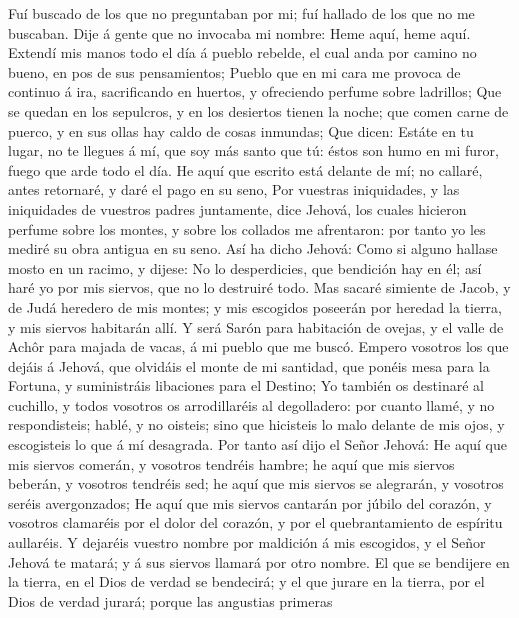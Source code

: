  Fuí buscado de los que no preguntaban por mi; fuí hallado
de los que no me buscaban. Dije á gente que no invocaba mi nombre: Heme
aquí, heme aquí.  Extendí mis manos todo el día á pueblo
rebelde, el cual anda por camino no bueno, en pos de sus pensamientos;
 Pueblo que en mi cara me provoca de continuo á ira,
sacrificando en huertos, y ofreciendo perfume sobre ladrillos;
 Que se quedan en los sepulcros, y en los desiertos tienen
la noche; que comen carne de puerco, y en sus ollas hay caldo de cosas
inmundas;  Que dicen: Estáte en tu lugar, no te llegues á
mí, que soy más santo que tú: éstos son humo en mi furor, fuego que arde
todo el día.  He aquí que escrito está delante de mí; no
callaré, antes retornaré, y daré el pago en su seno,  Por
vuestras iniquidades, y las iniquidades de vuestros padres juntamente,
dice Jehová, los cuales hicieron perfume sobre los montes, y sobre los
collados me afrentaron: por tanto yo les mediré su obra antigua en su
seno.  Así ha dicho Jehová: Como si alguno hallase mosto en
un racimo, y dijese: No lo desperdicies, que bendición hay en él; así
haré yo por mis siervos, que no lo destruiré todo.  Mas
sacaré simiente de Jacob, y de Judá heredero de mis montes; y mis
escogidos poseerán por heredad la tierra, y mis siervos habitarán allí.
 Y será Sarón para habitación de ovejas, y el valle de
Achôr para majada de vacas, á mi pueblo que me buscó. 
Empero vosotros los que dejáis á Jehová, que olvidáis el monte de mi
santidad, que ponéis mesa para la Fortuna, y suministráis libaciones
para el Destino;  Yo también os destinaré al cuchillo, y
todos vosotros os arrodillaréis al degolladero: por cuanto llamé, y no
respondisteis; hablé, y no oisteis; sino que hicisteis lo malo delante
de mis ojos, y escogisteis lo que á mí desagrada.  Por
tanto así dijo el Señor Jehová: He aquí que mis siervos comerán, y
vosotros tendréis hambre; he aquí que mis siervos beberán, y vosotros
tendréis sed; he aquí que mis siervos se alegrarán, y vosotros seréis
avergonzados;  He aquí que mis siervos cantarán por júbilo
del corazón, y vosotros clamaréis por el dolor del corazón, y por el
quebrantamiento de espíritu aullaréis.  Y dejaréis vuestro
nombre por maldición á mis escogidos, y el Señor Jehová te matará; y á
sus siervos llamará por otro nombre.  El que se bendijere
en la tierra, en el Dios de verdad se bendecirá; y el que jurare en la
tierra, por el Dios de verdad jurará; porque las angustias primeras
